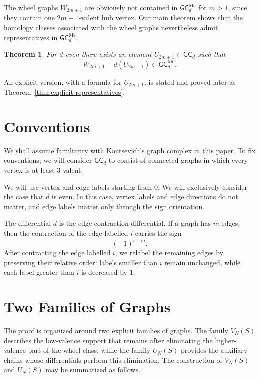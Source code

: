 \documentclass[11pt]{article}
\theoremstyle{definition}
\theoremstyle{plain}
\newtheorem*{maintheorem}{Theorem}
\newcommand{\GC}{\mathsf{GC}}
\begin{document}
The wheel graphs $W_{2m+1}$ are obviously not contained in $\GC_d^{\mathrm{Me}}$ for $m>1$, 
since they contain one $2m+1$-valent hub vertex. 
Our main theorem shows that the homology classes associated with the wheel graphs nevertheless admit representatives in $\GC_d^{\mathrm{Me}}$.

\begin{maintheorem}
For $d$ even there exists an element $U_{2m+1} \in \GC_d$ such that
\[
W_{2m+1} -d(U_{2m+1})\in \GC_d^{\mathrm{Me}}.
\]
\end{maintheorem}

An explicit version, with a formula for $U_{2m+1}$, is stated and proved later as Theorem~\ref{thm:explicit-representatives}.

\section{Conventions}
We shall assume familiarity with Kontsevich's graph complex in this paper.
To fix conventions, we will consider $\GC_d$ to consist of connected graphs in which every vertex is at least $3$-valent.

We will use vertex and edge labels starting from $0$.
We will exclusively consider the case that $d$ is even. In this case, vertex labels and edge directions do not matter, and edge labels matter only through the sign orientation.

The differential $d$ is the edge-contraction differential. If a graph has $m$ edges, then the contraction of the edge labelled $i$ carries the sign
\[
(-1)^{i+m}.
\]
After contracting the edge labelled $i$, we relabel the remaining edges by preserving their relative order: labels smaller than $i$ remain unchanged, while each label greater than $i$ is decreased by $1$.


\section{Two Families of Graphs}
The proof is organized around two explicit families of graphs.
The family $V_N(S)$ describes the low-valence support that remains after eliminating the higher-valence part of the wheel class, while the family $U_N(S)$ provides the auxiliary chains whose differentials perform this elimination.
The construction of $V_N(S)$ and $U_N(S)$ may be summarized as follows.
\end{document}
